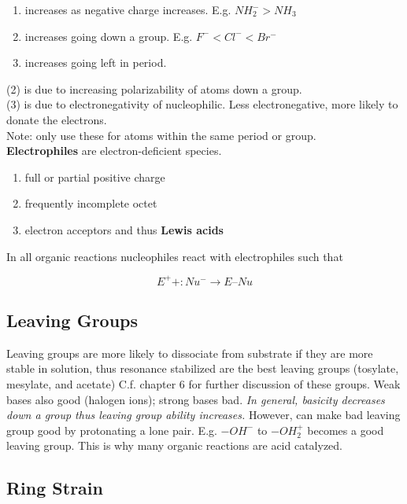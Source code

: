 \documentclass[../OChemReview.tex]{subfiles}
\begin{document}
  \begin{enumerate}
    \item increases as negative charge increases. E.g. $ NH_{2}^{-} > NH_{3}$ 
    \item increases going down a group. E.g. $ F^{-} < Cl^{-} < Br^{-} $
    \item increases going left in period.
  \end{enumerate}

  (2) is due to increasing polarizability of atoms down a group.\\
  (3) is due to electronegativity of nucleophilic. Less electronegative, more
  likely to donate the electrons.\\
  Note: only use these for atoms within the same period or group.\\

  \textbf{Electrophiles} are electron-deficient species. 
  \begin{enumerate}
    \item full or partial positive charge
    \item frequently incomplete octet
    \item electron acceptors and thus \textbf{Lewis acids}
  \end{enumerate}

  In all organic reactions nucleophiles react with electrophiles such that

  \[ E^{+} + :Nu^{-} \longrightarrow E\text{--}Nu \]

  \subsection{Leaving Groups}

  Leaving groups are more likely to dissociate from substrate if they are more
  stable in solution, thus resonance stabilized are the best leaving groups
  (tosylate, mesylate, and acetate) C.f. chapter 6 for further discussion of
  these groups. Weak bases also good (halogen ions); strong bases bad. \emph{In
  general, basicity decreases down a group thus leaving group ability
increases.} However, can make bad leaving group good by protonating a lone pair.
E.g. $ -OH^{-} $ to $ -OH_{2}^{+} $ becomes a good leaving group. This is why
many organic reactions are acid catalyzed.

  \subsection{Ring Strain}
\end{document}
